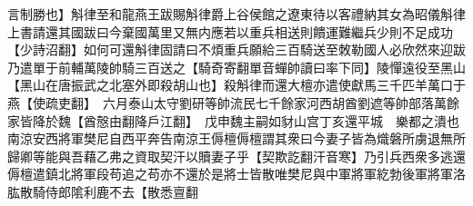 言制勝也】斛律至和龍燕王跋賜斛律爵上谷侯館之遼東待以客禮納其女為昭儀斛律上書請還其國跋曰今棄國萬里又無内應若以重兵相送則饋運難繼兵少則不足成功【少詩沼翻】如何可還斛律固請曰不煩重兵願給三百騎送至敇勒國人必欣然來迎跋乃遣單于前輔萬陵帥騎三百送之【騎奇寄翻單音蟬帥讀曰率下同】陵憚遠役至黑山【黑山在唐振武之北塞外即殺胡山也】殺斛律而還大檀亦遣使獻馬三千匹羊萬口于燕【使疏吏翻】　六月泰山太守劉研等帥流民七千餘家河西胡酋劉遮等帥部落萬餘家皆降於魏【酋慤由翻降戶江翻】　戊申魏主嗣如豺山宫丁亥還平城　樂都之潰也南涼安西將軍樊尼自西平奔告南涼王傉檀傉檀謂其衆曰今妻子皆為熾磐所虜退無所歸卿等能與吾藉乙弗之資取契汗以贖妻子乎【契欺訖翻汗音寒】乃引兵西衆多逃還傉檀遣鎮北將軍段苟追之苟亦不還於是將士皆散唯樊尼與中軍將軍紇勃後軍將軍洛肱散騎侍郎隂利鹿不去【散悉亶翻